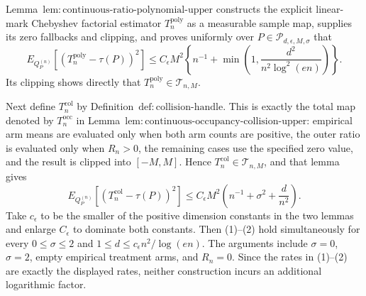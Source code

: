 Lemma~\(\mathrm{lem:continuous\text{-}ratio\text{-}polynomial\text{-}upper}\) constructs the explicit linear-mark Chebyshev factorial estimator \(T_n^{\mathrm{poly}}\) as a measurable sample map, supplies its zero fallbacks and clipping, and proves uniformly over \(P\in\mathcal P_{d,\epsilon,M,\sigma}\) that
\[
 E_{Q_P^{(n)}}[(T_n^{\mathrm{poly}}-\tau(P))^2]
 \le C_\epsilon M^2\left\{n^{-1}+
 \min\left(1,\frac{d^2}{n^2\log^2(en)}\right)\right\}.
\tag{1}
\]
Its clipping shows directly that \(T_n^{\mathrm{poly}}\in\mathcal T_{n,M}\).

Next define \(T_n^{\mathrm{col}}\) by Definition~\(\mathrm{def:collision\text{-}handle}\).  This is exactly the total map denoted by \(T_n^{\mathrm{occ}}\) in Lemma~\(\mathrm{lem:continuous\text{-}occupancy\text{-}collision\text{-}upper}\): empirical arm means are evaluated only when both arm counts are positive, the outer ratio is evaluated only when \(R_n>0\), the remaining cases use the specified zero value, and the result is clipped into \([-M,M]\).  Hence \(T_n^{\mathrm{col}}\in\mathcal T_{n,M}\), and that lemma gives
\[
 E_{Q_P^{(n)}}[(T_n^{\mathrm{col}}-\tau(P))^2]
 \le C_\epsilon M^2\left(n^{-1}+\sigma^2+\frac d{n^2}\right).
\tag{2}
\]
Take \(c_\epsilon\) to be the smaller of the positive dimension constants in the two lemmas and enlarge \(C_\epsilon\) to dominate both constants.  Then (1)--(2) hold simultaneously for every \(0\le\sigma\le2\) and \(1\le d\le c_\epsilon n^2/\log(en)\).  The arguments include \(\sigma=0\), \(\sigma=2\), empty empirical treatment arms, and \(R_n=0\).  Since the rates in (1)--(2) are exactly the displayed rates, neither construction incurs an additional logarithmic factor.